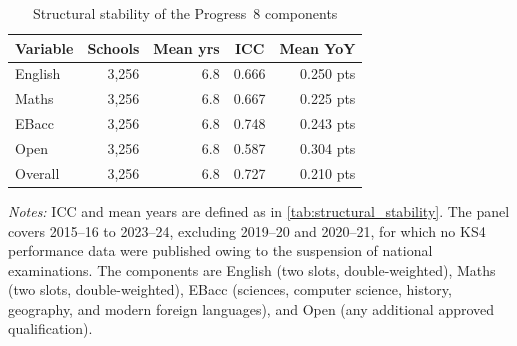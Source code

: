 \begin{table}[htb]
\centering\caption{Structural stability of the Progress~8 components}
\label{tab:p8_component_stability}
\small
\begin{tabular}{lrrrr}
\toprule
Variable & \multicolumn{1}{c}{Schools} & \multicolumn{1}{c}{Mean yrs} & \multicolumn{1}{c}{ICC} & \multicolumn{1}{c}{Mean YoY} \\
\midrule
\quad English   & {3,256} & 6.8 & 0.666 & 0.250 pts \\
\quad Maths     & {3,256} & 6.8 & 0.667 & 0.225 pts \\
\quad EBacc     & {3,256} & 6.8 & 0.748 & 0.243 pts \\
\quad Open      & {3,256} & 6.8 & 0.587 & 0.304 pts \\
\quad Overall   & {3,256} & 6.8 & 0.727 & 0.210 pts \\
\bottomrule
\end{tabular}
\begin{minipage}{\linewidth}
\smallskip
\footnotesize\textit{Notes:} ICC and mean years are defined as in
\cref{tab:structural_stability}. The panel covers 2015--16 to 2023--24,
excluding 2019--20 and 2020--21, for which no KS4 performance data were
published owing to the suspension of national examinations. The components
are English (two slots, double-weighted), Maths (two slots,
double-weighted), EBacc (sciences, computer science, history, geography, and
modern foreign languages), and Open (any additional approved
qualification).
\end{minipage}
\end{table}
